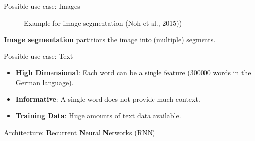 \documentclass[11pt,compress,t,notes=noshow, xcolor=table]{beamer}
\begin{document}
\begin{frame} {Possible use-case: Images}
\begin{figure}
\centering
{}
\caption{Example for image segmentation (Noh et al., 2015))} 
\end{figure}
\textbf{Image segmentation} partitions the image into (multiple) segments.
\end{frame}

\begin{frame} {Possible use-case: Text}
\begin{itemize}
\item \textbf{High Dimensional}: Each word can be a single feature (300000 words in the German language).
\vspace{.1cm}
\item \textbf{Informative}: A single word does not provide much context.
\vspace{.1cm}
\item \textbf{Training Data}: Huge amounts of text data available.
\end{itemize}
\vspace{.3cm}
Architecture: \textbf{R}ecurrent \textbf{N}eural \textbf{N}etworks (RNN)
\begin{figure}
\centering
{}
\end{figure}
\end{frame}
\end{document}
